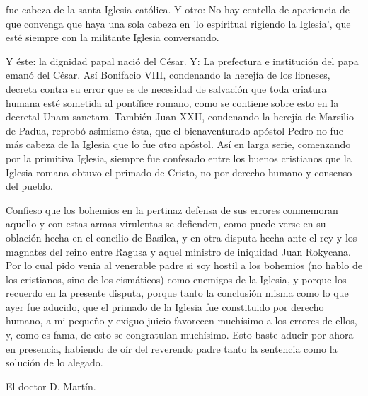fue cabeza de la santa Iglesia católica. Y otro: No hay centella de apariencia de que convenga que haya una sola cabeza en 'lo espiritual rigiendo la Iglesia', que esté siempre con la militante Iglesia conversando.

Y éste: la dignidad papal nació del César. Y: La prefectura e institución del papa emanó del César. Así Bonifacio VIII, condenando la herejía de los lioneses, decreta contra su error que es de necesidad de salvación que toda criatura humana esté sometida al pontífice romano, como se contiene sobre esto en la decretal Unam sanctam. También Juan XXII, condenando la herejía de Marsilio de Padua, reprobó asimismo ésta, que el bienaventurado apóstol Pedro no fue más cabeza de la Iglesia que lo fue otro apóstol. Así en larga serie, comenzando por la primitiva Iglesia, siempre fue confesado entre los buenos cristianos que la Iglesia romana obtuvo el primado de Cristo, no por derecho humano y consenso del pueblo.

Confieso que los bohemios en la pertinaz defensa de sus errores conmemoran aquello y con estas armas virulentas se defienden, como puede verse en su oblación hecha en el concilio de Basilea, y en otra disputa hecha ante el rey y los magnates del reino entre Ragusa y aquel ministro de iniquidad Juan Rokycana. Por lo cual pido venia al venerable padre si soy hostil a los bohemios (no hablo de los cristianos, sino de los cismáticos) como enemigos de la Iglesia, y porque los recuerdo en la presente disputa, porque tanto la conclusión misma como lo que ayer fue aducido, que el primado de la Iglesia fue constituido por derecho humano, a mi pequeño y exiguo juicio favorecen muchísimo a los errores de ellos, y, como es fama, de esto se congratulan muchísimo. Esto baste aducir por ahora en presencia, habiendo de oír del reverendo padre tanto la sentencia como la solución de lo alegado.

El doctor D. Martín.

